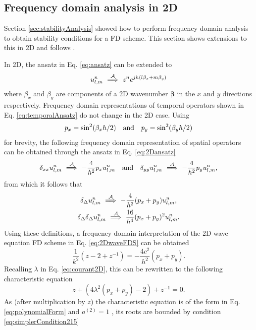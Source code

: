 \subsection{Frequency domain analysis in 2D}\label{sec:stability2Dwave}
Section \ref{sec:stabilityAnalysis} showed how to perform frequency domain analysis to obtain stability conditions for a FD scheme. This section shows extensions to this in 2D and follows \cite[Ch. 10]{theBible}.

In 2D, the ansatz in Eq. \eqref{eq:ansatz} can be extended to 
\begin{equation}\label{eq:2Dansatz}
    u_{l,m}^n \ \overset{\mathcal{A}}{\Longrightarrow}\  z^n e^{jh(l\beta_x + m\beta_y)}
\end{equation}
where $\beta_x$ and $\beta_y$ are components of a 2D wavenumber $\boldsymbol{\beta}$ in the $x$ and $y$ directions respectively. Frequency domain representations of temporal operators shown in Eq. \eqref{eq:temporalAnsatz} do not change in the 2D case. Using 
\begin{equation}\label{eq:pxpy}
    p_x = \sin^2(\beta_x h/2) \quad \text{and} \quad p_y = \sin^2(\beta_y h/2)
\end{equation}
for brevity, the following frequency domain representation of spatial operators can be obtained through the ansatz in Eq. \eqref{eq:2Dansatz}
\begin{equation}
    \delta_{xx} u_{l,m}^n \ \overset{\mathcal{A}}{\Longrightarrow}\  -\frac{4}{h^2}p_x 
    u_{l,m}^n \quad \text{and} \quad \delta_{yy} u_{l,m}^n \ \overset{\mathcal{A}}{\Longrightarrow}\  -\frac{4}{h^2}p_y 
    u_{l,m}^n,
\end{equation}
from which it follows that
\begin{gather}
    \delta_{\Delta}u_{l,m}^n \ \overset{\mathcal{A}}{\Longrightarrow}\  -\frac{4}{h^2}(p_x + p_y)u_{l,m}^n,\label{eq:laplacianAnsatz}\\
    \delta_{\Delta}\delta_{\Delta}u_{l,m}^n \ \overset{\mathcal{A}}{\Longrightarrow}\  \frac{16}{h^4}(p_x + p_y)^2u_{l,m}^n.\label{eq:biharmonicAnsatz}
\end{gather}
%
Using these definitions, a frequency domain interpretation of the 2D wave equation FD scheme in Eq. \eqref{eq:2DwaveFDS} can be obtained
\begin{equation*}
    \frac{1}{k^2}\left(z - 2 +z^{-1}\right) = -\frac{4c^2}{h^2} (p_x + p_y).
\end{equation*}
Recalling $\lambda$ in Eq. \eqref{eq:courant2D}, this can be rewritten to the following characteristic equation
\begin{equation}
    z + \left(4\lambda^2(p_x + p_y)-2\right) +z^{-1} = 0.
\end{equation}
As (after multiplication by $z$) the characteristic equation is of the form in Eq. \eqref{eq:polynomialForm} and $a^{(2)} = 1$ , its roots are bounded by condition \eqref{eq:simplerCondition215} 

